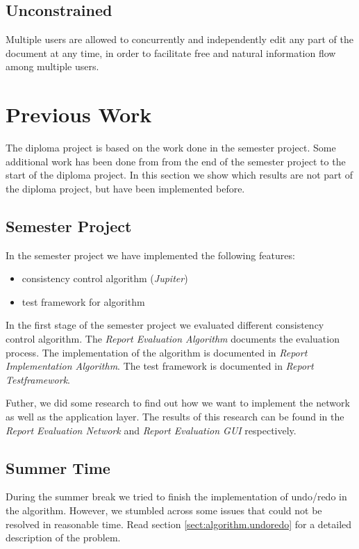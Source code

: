 \subsection{Unconstrained} 
Multiple users are allowed to concurrently and
independently edit any part of the document at any time, in order to 
facilitate free and natural information flow among multiple users.



\section{Previous Work}
\label{sect:overview.previouswork}

The diploma project is based on the work done in the semester project. Some
additional work has been done from from the end of the semester
project to the start of the diploma project. In this section we show which
results are not part of the diploma project, but have been implemented
before.

\subsection{Semester Project}
In the semester project we have implemented the following features:
\begin{itemize}
 \item consistency control algorithm (\emph{Jupiter})
 \item test framework for algorithm
\end{itemize}

In the first stage of the semester project we evaluated different
consistency control algorithm. The \emph{Report Evaluation Algorithm}
documents the evaluation process. The implementation of the
algorithm is documented in \emph{Report Implementation Algorithm}. The
test framework is documented in \emph{Report Testframework}.

Futher, we did some research to find out how we want to implement the
network as well as the application layer. The results of this research
can be found in the \emph{Report Evaluation Network} and 
\emph{Report Evaluation GUI} respectively.


\subsection{Summer Time}
During the summer break we tried to finish the implementation of undo/redo
in the algorithm. However, we stumbled across some issues that could not
be resolved in reasonable time. Read section \ref{sect:algorithm.undoredo} for
a detailed description of the problem.

